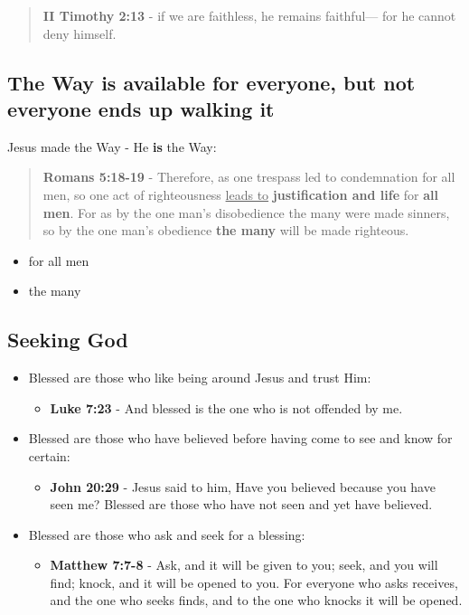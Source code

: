 \documentclass[11pt]{article}
\begin{document}
\begin{quote}
\textbf{II Timothy 2:13} - if we are faithless, he remains faithful— for he cannot deny himself.
\end{quote}

\subsection{The Way is available for everyone, but not everyone ends up walking it}
\label{sec:orgb21209d}
Jesus made the Way - He \textbf{is} the Way:

\begin{quote}
\textbf{Romans 5:18-19} - Therefore, as one trespass led to condemnation for all men, so one act of righteousness \uline{leads to} \textbf{justification and life} for \textbf{all men}. For as by the one man's disobedience the many were made sinners, so by the one man's obedience \textbf{the many} will be made righteous.
\end{quote}

\begin{itemize}
\item for all men
\item the many
\end{itemize}

\subsection{Seeking God}
\label{sec:org4421492}
\begin{itemize}
\item Blessed are those who like being around Jesus and trust Him:
\begin{itemize}
\item \textbf{Luke 7:23} - And blessed is the one who is not offended by me.
\end{itemize}

\item Blessed are those who have believed before having come to see and know for certain:
\begin{itemize}
\item \textbf{John 20:29} - Jesus said to him, Have you believed because you have seen me? Blessed are those who have not seen and yet have believed.􇩙
\end{itemize}

\item Blessed are those who ask and seek for a blessing:
\begin{itemize}
\item \textbf{Matthew 7:7-8} - Ask, and it will be given to you; seek, and you will find; knock, and it will be opened to you. For everyone who asks receives, and the one who seeks finds, and to the one who knocks it will be opened.
\end{itemize}
\end{itemize}
\end{document}

